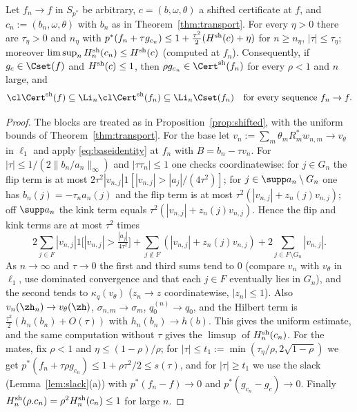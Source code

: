 \begin{theorem}\label{thm:shifted}
Let $f_n\to f$ in $S_{p^*}$ be arbitrary, $c=(b,\omega,\theta)$ a shifted
certificate at $f$, and $c_n:=(b_n,\omega,\theta)$ with $b_n$ as in
Theorem~\ref{thm:transport}.  For every $\eta>0$ there are $\tau_\eta>0$ and
$n_\eta$ with $p^*(f_n+\tau g_{c_n})\le1+\frac{\tau^2}2(H^{\rm sh}(c)+\eta)$
for $n\ge n_\eta$, $|\tau|\le\tau_\eta$; moreover $\limsup_nH^{\rm
sh}_n(c_n)\le H^{\rm sh}(c)$ \textup{(}computed at $f_n$\textup{)}.
Consequently, if $g_c\in\Cset(f)$ and $H^{\rm sh}(c)\le1$, then
$\rho g_{c_n}\in\Cert^{\rm sh}(f_n)$ for every $\rho<1$ and $n$ large, and
\[
 \cl\Cert^{\rm sh}(f)\subseteq\Li_n\cl\Cert^{\rm sh}(f_n)\subseteq
 \Li_n\Cset(f_n)\quad\text{for every sequence }f_n\to f.
\]
\end{theorem}

\begin{proof}
The blocks are treated as in Proposition~\ref{prop:shifted}, with the
uniform bounds of Theorem~\ref{thm:transport}.  For the base let
$v_n:=\sum_m\theta_mR_m^*w_{n,m}\to v_\theta$ in $\ell_1$ and apply
\eqref{eq:baseidentity} at $f_n$ with $B=b_n-\tau v_n$.  For
$|\tau|\le1/(2\|b_n/a_n\|_\infty)$ and $|\tau\tau_n|\le1$ one checks
coordinatewise: for $j\in G_n$ the flip term is at most
$2\tau^2|v_{n,j}|1[|v_{n,j}|>|a_j|/(4\tau^2)]$; for $j\in\supp a_n\setminus
G_n$ one has $b_n(j)=-\tau_na_n(j)$ and the flip term is at most
$\tau^2(|v_{n,j}|+z_n(j)v_{n,j})$; off $\supp a_n$ the kink term equals
$\tau^2(|v_{n,j}|+z_n(j)v_{n,j})$.  Hence the flip and kink terms are at
most $\tau^2$ times
\[
 2\sum_{j\in F}|v_{n,j}|1\big[|v_{n,j}|>\tfrac{|a_j|}{4\tau^2}\big]
 +\sum_{j\notin F}(|v_{n,j}|+z_n(j)v_{n,j})+2\sum_{j\in F\setminus
 G_n}|v_{n,j}|.
\]
As $n\to\infty$ and $\tau\to0$ the first and third sums tend to $0$
(compare $v_n$ with $v_\theta$ in $\ell_1$, use dominated convergence and
that each $j\in F$ eventually lies in $G_n$), and the second tends to
$\kappa_q(v_\theta)$ ($z_n\to z$ coordinatewise, $|z_n|\le1$).  Also
$v_n(\zh_n)\to v_\theta(\zh)$, $\sigma_{n,m}\to\sigma_m$,
$q_0^{(n)}\to q_0$, and the Hilbert term is
$\frac{\tau^2}2(h_n(b_n)+O(\tau))$ with $h_n(b_n)\to h(b)$.  This gives the
uniform estimate, and the same computation without $\tau$ gives the
$\limsup$ of $H^{\rm sh}_n(c_n)$.  For the mates, fix $\rho<1$ and
$\eta\le(1-\rho)/\rho$; for $|\tau|\le t_1:=\min(\tau_\eta/\rho,
2\sqrt{1-\rho})$ we get $p^*(f_n+\tau\rho g_{c_n})\le1+\rho\tau^2/2\le
s(\tau)$, and for $|\tau|\ge t_1$ we use the slack
(Lemma~\ref{lem:slack}(a)) with $p^*(f_n-f)\to0$ and
$p^*(g_{c_n}-g_c)\to0$.  Finally $H^{\rm sh}_n(\rho.c_n)=\rho^2H^{\rm
sh}_n(c_n)\le1$ for large $n$.
\end{proof}

